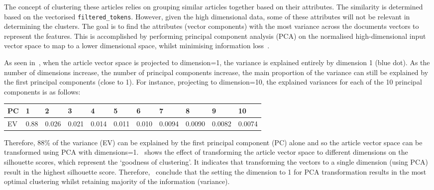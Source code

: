   The concept of clustering these articles relies on grouping similar articles together based on their attributes. The similarity is determined based on the vectorised \texttt{filtered\_tokens}. However, given the high dimensional data, some of these attributes will not be relevant in determining the clusters. The goal is to find the attributes (vector components) with the most variance across the documents vectors to represent the features. This is accomplished by performing principal component analysis (PCA) on the normalised high-dimensional input vector space to map to a lower dimensional space, whilst minimising information loss~\cite{pca_clustering}.

  As seen in~, when the article vector space is projected to dimension=1, the variance is explained entirely by dimension 1 (blue dot). As the number of dimensions increase, the number of principal components increase, the main proportion of the variance can still be explained by the first principal components (close to 1). For instance, projecting to dimension=10, the explained variances for each of the 10 principal components is as follows: 
  \begin{table}[H]
      \centering
  \renewcommand{\arraystretch}{1.1}
  \begin{tabularx}{\textwidth}{|X|X X X X X X X X X X|} 
    \hline
    PC & \textbf{1} & \textbf{2}  & \textbf{3}  & \textbf{4}  & \textbf{5} & \textbf{6} & \textbf{7}  & \textbf{8}  & \textbf{9}  & \textbf{10}\\
    \hline
    EV & 0.88 & 0.026 & 0.021 & 0.014 & 0.011 & 0.010 & 0.0094 & 0.0090 & 0.0082 & 0.0074\\ 
    \hline
    \end{tabularx}
  \end{table}
  
  Therefore, 88\% of the variance (EV) can be explained by the first principal component (PC) alone and so the article vector space can be transformed using PCA with dimensions=1.~ shows the effect of transforming the article vector space to different dimensions on the silhouette scores, which represent the `goodness of clustering'. It indicates that transforming the vectors to a single dimension (using PCA) result in the highest silhouette score. Therefore,~ conclude that the setting the dimension to 1 for PCA transformation results in the most optimal clustering whilst retaining majority of the information (variance).

